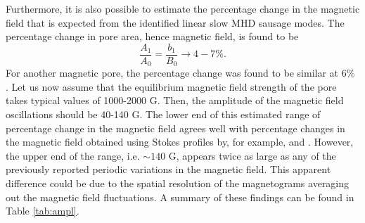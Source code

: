     Furthermore, it is also possible to estimate the percentage change in the magnetic field that is expected from the identified linear slow MHD sausage modes.
    The percentage change in pore area, hence magnetic field, is found to be $$\frac{A_1}{A_0} = \frac{b_1}{B_0} \rightarrow 4-7\%.$$
   	For another magnetic pore, the percentage change was found to be similar at 6\% \citep{0004-637X-806-1-132}.
    Let us now assume that the equilibrium magnetic field strength of the pore takes typical values of 1000-2000 G.
    Then, the amplitude of the magnetic field oscillations should be 40-140 G.
    The lower end of this estimated range of percentage change in the magnetic field agrees well with percentage changes in the magnetic field obtained using Stokes profiles by, for example, \citet{Balthasar2000} and \citet{PMHDW}.
    However, the upper end of the range, i.e. $\sim 140$ G, appears twice as large as any of the previously reported periodic variations in the magnetic field. 
    This apparent difference could be due to the spatial resolution of the magnetograms averaging out the magnetic field fluctuations.
    A summary of these findings can be found in Table \ref{tab:ampl}.
    
